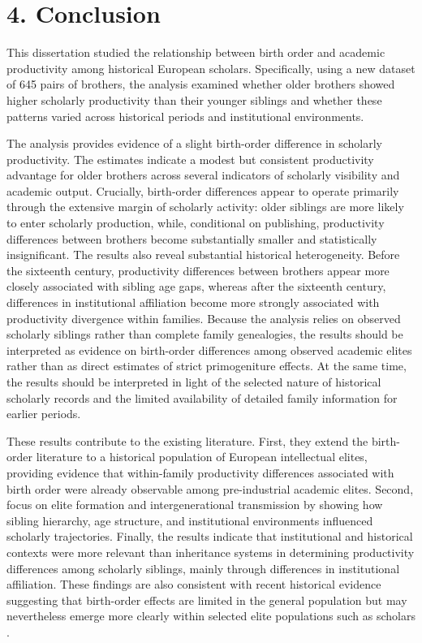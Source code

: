 \setcounter{section}{8}
\section*{4. Conclusion}

This dissertation studied the relationship between birth order and academic productivity among historical European scholars. Specifically, using a new dataset of 645 pairs of brothers, the analysis examined whether older brothers showed higher scholarly productivity than their younger siblings and whether these patterns varied across historical periods and institutional environments.

The analysis provides evidence of a slight birth-order difference in scholarly productivity. The estimates indicate a modest but consistent productivity advantage for older brothers across several indicators of scholarly visibility and academic output. Crucially, birth-order differences appear to operate primarily through the extensive margin of scholarly activity: older siblings are more likely to enter scholarly production, while, conditional on publishing, productivity differences between brothers become substantially smaller and statistically insignificant. The results also reveal substantial historical heterogeneity. Before the sixteenth century, productivity differences between brothers appear more closely associated with sibling age gaps, whereas after the sixteenth century, differences in institutional affiliation become more strongly associated with productivity divergence within families. Because the analysis relies on observed scholarly siblings rather than complete family genealogies, the results should be interpreted as evidence on birth-order differences among observed academic elites rather than as direct estimates of strict primogeniture effects. At the same time, the results should be interpreted in light of the selected nature of historical scholarly records and the limited availability of detailed family information for earlier periods.

These results contribute to the existing literature. First, they extend the birth-order literature to a historical population of European intellectual elites, providing evidence that within-family productivity differences associated with birth order were already observable among pre-industrial academic elites. Second, focus on elite formation and intergenerational transmission by showing how sibling hierarchy, age structure, and institutional environments influenced scholarly trajectories. Finally, the results indicate that institutional and historical contexts were more relevant than inheritance systems in determining productivity differences among scholarly siblings, mainly through differences in institutional affiliation. These findings are also consistent with recent historical evidence suggesting that birth-order effects are limited in the general population but may nevertheless emerge more clearly within selected elite populations such as scholars \citep{ClarkCummins2024}.


